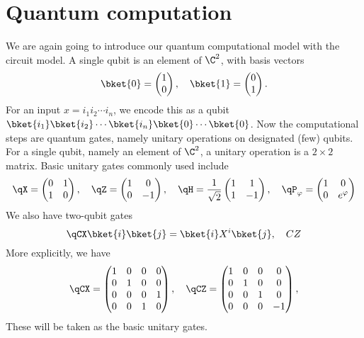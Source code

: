 \documentclass[a4paper]{article}
\begin{document}
\section{Quantum computation}
We are again going to introduce our quantum computational model with the circuit model. A single qubit is an element of $\C^2$, with basis vectors
\[
  \bket{0} =
  \begin{pmatrix}
    1 \\ 0
  \end{pmatrix},\quad
  \bket{1} =
  \begin{pmatrix}
    0 \\ 1
  \end{pmatrix}.
\]
For an input $x = i_1i_2\cdots i_n$, we encode this as a qubit $\bket{i_1} \bket{i_2}\cdots\bket{i_n}\bket{0}\cdots\bket{0}$. Now the computational steps are quantum gates, namely unitary operations on designated (few) qubits. For a single qubit, namely an element of $\C^2$, a unitary operation is a $2 \times 2$ matrix. Basic unitary gates commonly used include
\[
  \qX =
  \begin{pmatrix}
    0 & 1\\
    1 & 0
  \end{pmatrix},\quad
  \qZ =
  \begin{pmatrix}
    1 & 0\\
    0 & -1
  \end{pmatrix},\quad
  \qH = \frac{1}{\sqrt{2}}
  \begin{pmatrix}
    1 & 1\\
    1 & -1
  \end{pmatrix},\quad
  \qP_\varphi =
  \begin{pmatrix}1 & 0\\0 & e^{\varphi}\end{pmatrix}
\]
We also have two-qubit gates
\[
  \qCX\bket{i}\bket{j} = \bket{i} X^i\bket{j},\quad CZ
\]
More explicitly, we have
\[
  \qCX =
  \begin{pmatrix}
    1 & 0 & 0 & 0\\
    0 & 1 & 0 & 0\\
    0 & 0 & 0 & 1\\
    0 & 0 & 1 & 0
  \end{pmatrix},\quad
  \qCZ =
  \begin{pmatrix}
    1 & 0 & 0 & 0\\
    0 & 1 & 0 & 0\\
    0 & 0 & 1 & 0\\
    0 & 0 & 0 & -1
  \end{pmatrix},
\]
These will be taken as the basic unitary gates.
\end{document}
